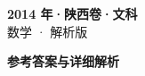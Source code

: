\documentclass[zihao=-4, a4paper]{ctexart}
\begin{document}
\begin{center}
  {\Large\bfseries 2014 年·陕西卷·文科}\\[4pt]
  {\large 数学 · 解析版}
\end{center}
\medskip
{}

\clearpage
{}
\begin{center}{\Large\bfseries 参考答案与详细解析}\end{center}
\medskip

\end{document}
